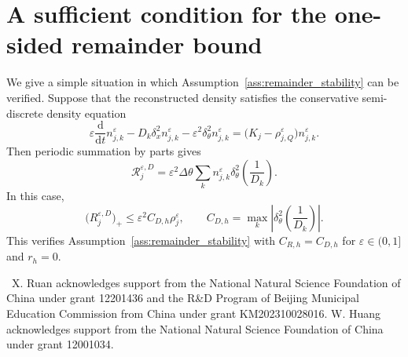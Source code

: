 \documentclass[11pt]{article}
\begin{document}
\section{A sufficient condition for the one-sided remainder bound}
\label{app:remainder}

We give a simple situation in which Assumption~\ref{ass:remainder_stability} can be
verified.  Suppose that the reconstructed density satisfies the conservative
semi-discrete density equation
\begin{equation}
\label{eq:app_density_compatible_n}
    \varepsilon\frac{\mathrm d}{\mathrm dt}n_{j,k}^\varepsilon
    -
    D_k\delta_x^2 n_{j,k}^\varepsilon
    -
    \varepsilon^2\delta_\theta^2 n_{j,k}^\varepsilon
    =
    \bigl(K_j-\rho_{j,Q}^\varepsilon\bigr)n_{j,k}^\varepsilon .
\end{equation}
Then periodic summation by parts gives
\[
    \mathcal R_j^{\varepsilon,D}
    =
    \varepsilon^2\Delta\theta
    \sum_k
    n_{j,k}^\varepsilon
    \delta_\theta^2\left(\frac{1}{D_k}\right).
\]
In this case, 
\[
    \bigl(R_j^{\varepsilon,D}\bigr)_+
    \le
    \varepsilon^2 C_{D,h}\rho_j^\varepsilon,
    \qquad
    C_{D,h}
    =
    \max_k
    \left|
    \delta_\theta^2\left(\frac{1}{D_k}\right)
    \right|.
\]
This verifies Assumption~\ref{ass:remainder_stability} with \(C_{R,h}=C_{D,h}\) for $\varepsilon\in(0,1]$ and
\(r_h=0\). 


\bigskip
{}  \ 
X. Ruan acknowledges support  from the National Natural Science Foundation of China under grant  12201436 and the R\&D Program of Beijing Municipal Education Commission
from China under grant KM202310028016.
W. Huang acknowledges support  from the National Natural Science Foundation of China under grant  12001034. 








%
%
%
%
%
\end{document}
